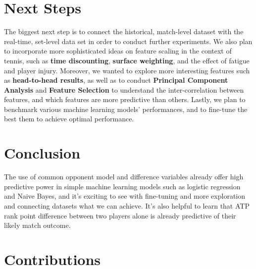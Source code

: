 \documentclass[paper=a4, fontsize=11pt]{scrartcl} %
\numberwithin{equation}{section} %
\numberwithin{figure}{section} %
\numberwithin{table}{section} %
\begin{document}

\section{Next Steps}
The biggest next step is to connect the historical, match-level dataset with the real-time, set-level data set in order to conduct further experiments. We also plan to incorporate more sophisticated ideas on feature scaling in the context of tennis, such as \textbf{time discounting}, \textbf{surface weighting}, and the effect of fatigue and player injury. Moreover, we wanted to explore more interesting features such as \textbf{head-to-head results}, as well as to conduct \textbf{Principal Component Analysis} and \textbf{Feature Selection} to understand the inter-correlation between features, and which features are more predictive than others. Lastly, we plan to benchmark various machine learning models' performances, and to fine-tune the best them to achieve optimal performance. 
\section{Conclusion}
The use of common opponent model and difference variables already offer high predictive power in simple machine learning models such as logistic regression and Naive Bayes, and it's exciting to see with fine-tuning and more exploration and connecting datasets what we can achieve. It's also helpful to learn that ATP rank point difference between two players alone is already predictive of their likely match outcome. 

\pagebreak
\appendix

\section{Contributions}
\end{document}
